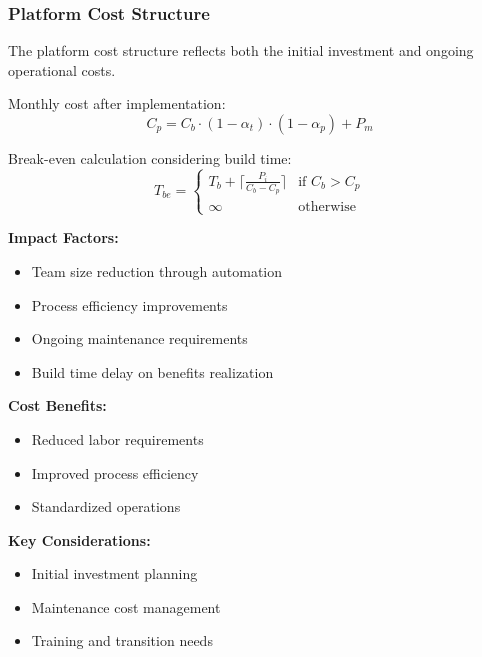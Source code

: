 \documentclass[12pt,a4paper]{article}
\newenvironment{definition}[1]
{\begin{mdframed}[style=definitionstyle,frametitle={Definition: #1}]}
{\end{mdframed}}
\newenvironment{observation}
{\begin{mdframed}[style=observationstyle,frametitle={Observation}]}
{\end{mdframed}}
\begin{document}
\subsubsection{Platform Cost Structure}
The platform cost structure reflects both the initial investment and ongoing operational costs.

\begin{definition}{Platform Cost}
Monthly cost after implementation:
\begin{equation}
    C_p = C_b \cdot (1 - \alpha_t) \cdot (1 - \alpha_p) + P_m
\end{equation}

Break-even calculation considering build time:
\begin{equation}
    T_{be} = \begin{cases}
        T_b + \lceil\frac{P_i}{C_b - C_p}\rceil & \text{if } C_b > C_p \\
        \infty & \text{otherwise}
    \end{cases}
\end{equation}

\textbf{Impact Factors:}
\begin{itemize}
    \item Team size reduction through automation
    \item Process efficiency improvements
    \item Ongoing maintenance requirements
    \item Build time delay on benefits realization
\end{itemize}
\end{definition}

\begin{observation}
\textbf{Cost Benefits:}
\begin{itemize}
    \item Reduced labor requirements
    \item Improved process efficiency
    \item Standardized operations
\end{itemize}
\textbf{Key Considerations:}
\begin{itemize}
    \item Initial investment planning
    \item Maintenance cost management
    \item Training and transition needs
\end{itemize}
\end{observation}
\end{document}
